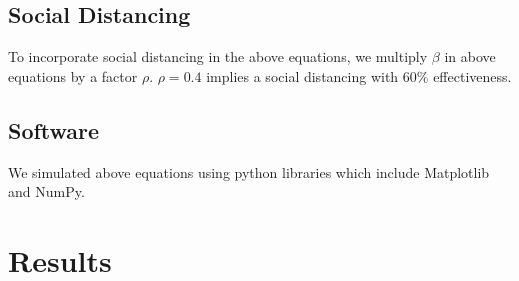 \documentclass{article}
\begin{document}
	\subsection{Social Distancing}
	To incorporate social distancing in the above equations, we multiply $\beta$ in above equations by a factor $\rho$. $\rho = 0.4$ implies a social distancing with $60\%$ effectiveness.


	\subsection{Software}
	We simulated above equations using python libraries which include Matplotlib and NumPy.

	\newpage

	\section{Results}
	
\end{document}
